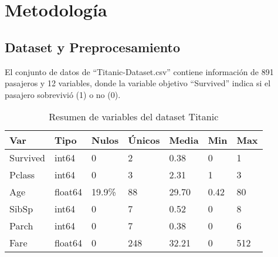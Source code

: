 \documentclass[sjournal]{IEEEtran}
\begin{document}
\section{Metodología}
\subsection{Dataset y Preprocesamiento
}
El conjunto de datos de “Titanic-Dataset.csv” contiene información de 891 pasajeros y 12 variables, donde la variable objetivo “Survived” indica si el pasajero sobrevivió (1) o no (0).

\begin{table}[H]
\centering
\begin{tabular}{|l|l|l|l|l|l|l|}
\hline
\textbf{Var}& \textbf{Tipo} & \textbf{ Nulos }& \textbf{Únicos} & \textbf{Media} & \textbf{Min}& \textbf{Max}\\
\hline
Survived & int64   & 0 & 2   & 0.38& 0    & 1   \\
\hline
Pclass   & int64   & 0 & 3   & 2.31& 1    & 3   \\
\hline
Age      & float64 & 19.9\%& 88  & 29.70& 0.42 & 80  \\
\hline
SibSp    & int64   & 0 & 7   & 0.52& 0    & 8   \\
\hline
Parch    & int64   & 0 & 7   & 0.38& 0    & 6   \\
\hline
Fare     & float64 & 0& 248 & 32.21& 0    & 512 \\
\hline
\end{tabular}
\caption{Resumen de variables del dataset Titanic}
\label{tab:resumen_variables}
\end{table}
\end{document}
